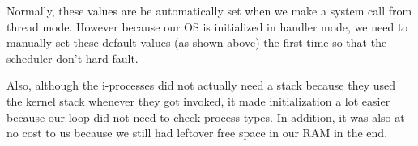 \documentclass[12pt]{article}
\begin{document}
\begin{enumerate}
	Normally, these values are be automatically set when we make a system call from thread mode. However because our OS is initialized in handler mode, we need to manually set these default values (as shown above) the first time so that the scheduler don't hard fault. 
	
	Also, although the i-processes did not actually need a stack because they used the kernel stack whenever they got invoked, it made initialization a lot easier because our loop did not need to check process types. In addition, it was also at no cost to us because we still had leftover free space in our RAM in the end. 
	
\end{enumerate}
\end{document}
